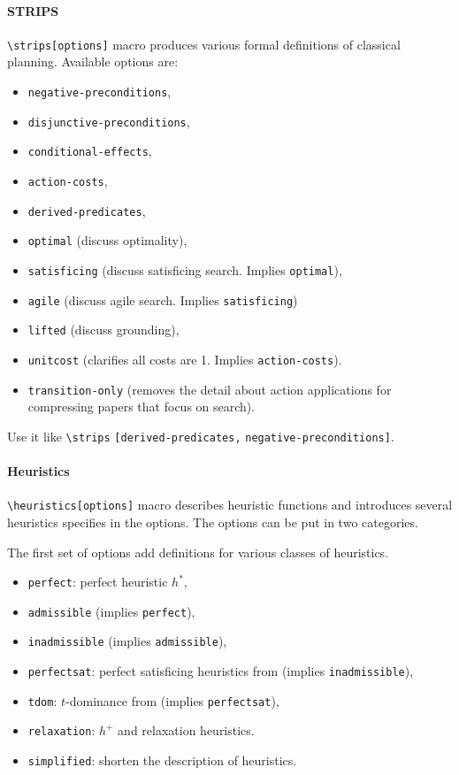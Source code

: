 \paragraph{STRIPS}

\verb`\strips[options]` macro produces various formal definitions of classical planning.
Available options are:
\begin{itemize}
 \item \texttt{negative-preconditions},
 \item \texttt{disjunctive-preconditions},
 \item \texttt{conditional-effects},
 \item \texttt{action-costs},
 \item \texttt{derived-predicates},
 \item \texttt{optimal} (discuss optimality),
 \item \texttt{satisficing} (discuss satisficing search. Implies \texttt{optimal}),
 \item \texttt{agile} (discuss agile search. Implies \texttt{satisficing})
 \item \texttt{lifted} (discuss grounding),
 \item \texttt{unitcost} (clarifies all costs are 1. Implies \texttt{action-costs}).
 \item \texttt{transition-only} (removes the detail about action applications for compressing papers that focus on search).
\end{itemize}
Use it like \verb`\strips` \texttt{[derived-predicates,} \texttt{negative-preconditions]}.

\paragraph{Heuristics}

\verb`\heuristics[options]` macro describes heuristic functions and
introduces several heuristics specifies in the options.
The options can be put in two categories.

The first set of options add definitions for various classes of heuristics.
\begin{itemize}
 \item \texttt{perfect}: perfect heuristic $h^*$,
 \item \texttt{admissible} (implies \texttt{perfect}),
 \item \texttt{inadmissible} (implies \texttt{admissible}),
 \item \texttt{perfectsat}: perfect satisficing heuristics from \cite{kuroiwa2022biased} (implies \texttt{inadmissible}),
 \item \texttt{tdom}: $t$-dominance from \cite{kuroiwa2022biased} (implies \texttt{perfectsat}),
 \item \texttt{relaxation}: $h^+$ and relaxation heuristics.
 \item \texttt{simplified}: shorten the description of heuristics.
\end{itemize}

